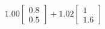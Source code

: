 \documentclass[preview]{standalone}
\begin{document}
\begin{align*}
1.00 \begin{bmatrix} 0.8 \\ 0.5 \end{bmatrix} + 1.02 \begin{bmatrix} 1 \\ 1.6 \end{bmatrix}
\end{align*}
\end{document}
